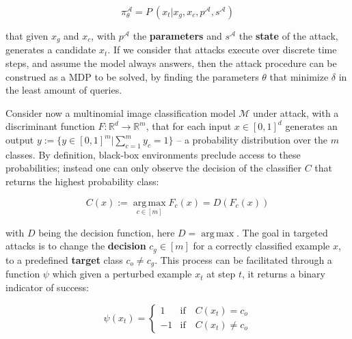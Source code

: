\begin{equation}
    \pi_\theta^{\mathcal{A}} = P\: (x_{t}|x_g, x_{c}, p^{\mathcal{A}}, s^{\mathcal{A}})
\label{eqn:genpolicy}
\end{equation}

\noindent that given $x_g$ and $x_{c}$, with $p^{\mathcal{A}}$ the \textbf{parameters} and $s^{\mathcal{A}}$ the \textbf{state} of the attack, generates a candidate $x_t$.
If we consider that attacks execute over discrete time steps, and assume the model always answers, then the attack procedure can be construed as a \gls{MDP} to be solved, by finding the parameters $\theta$ that minimize $\delta$ in the least amount of queries.

Consider now a multinomial image classification model $\mathcal{M}$ under attack, with a discriminant function $F: \mathbb{R}^d \rightarrow \mathbb{R}^m$, that for each input $x \in [0,1]^d$ generates an output $y := \{y \in [0,1]^m |\sum_{c=1}^{m}y_c = 1\}$ -- a probability distribution over the $m$ classes.
By definition, black-box environments preclude access to these probabilities; instead one can only observe the decision of the classifier $C$ that returns the highest probability class:

\begin{equation}
    C(x) := \operatorname*{arg\,max}_{c \in [m]} F_c(x) = D(F_c(x))
\label{eqn:classifier} 
\end{equation}

\noindent with $D$ being the decision function, here $D = \operatorname*{arg\,max}$.
The goal in targeted attacks is to change the \textbf{decision} $c_g \in [m]$ for a correctly classified example $x$, to a predefined \textbf{target} class $c_o \neq c_g$.
This process can be facilitated through a function $\psi$ which given a perturbed example $x_t$ at step $t$, it returns a binary indicator of success:

\begin{equation}
    \psi(x_t) = \begin{cases}
                    1 & \text{if}\quad C(x_t) = c_o\\
                    -1 & \text{if}\quad C(x_t) \neq c_o
                \end{cases}
\label{eqn:psi}
\end{equation}

